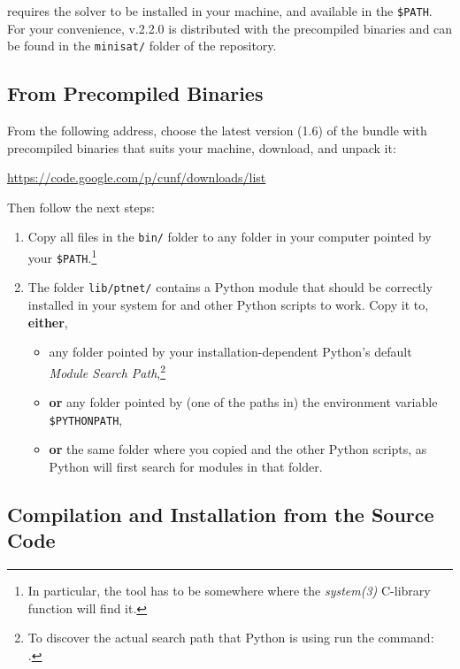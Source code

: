 \documentclass[a4paper]{refart}
\begin{document}
\cna requires the \minisat solver to be installed in your machine, and
available in the \verb!$PATH!.
For your convenience, \minisat v.2.2.0 is distributed with the precompiled
binaries and can be found in the \verb!minisat/! folder of the repository.

\subsection{From Precompiled Binaries}
\label{s:precompiled}

From the following address, choose the latest version (1.6) of the bundle
with precompiled binaries that suits your machine,
download, and unpack it:
\begin{center}
\url{https://code.google.com/p/cunf/downloads/list}
\end{center}
Then follow the next steps:
\begin{enumerate}
\item
  Copy all files in the \verb!bin/! folder to any folder in your
  computer pointed by your \verb!$PATH!.\footnote{In particular, the \minisat
  tool has to be somewhere where the \textit{system(3)} C-library function
  will find it.}
\item
  The folder \verb!lib/ptnet/! contains a Python module that should be
  correctly installed in your system for \cna and other Python scripts
  to work.
  Copy it to, \textbf{either},
  \begin{itemize}
  \item
    any folder pointed by your installation-dependent Python's default
    \textit{Module Search Path},\footnote{To discover the actual search
    path that Python is using run the command: \\
    .}
  \item
    \textbf{or} any folder pointed by (one of the paths in) the
    environment variable \verb!$PYTHONPATH!,
  \item
    \textbf{or} the same folder where you copied \cna and the other Python
    scripts, as Python will first search for modules in that folder.
  \end{itemize}
\end{enumerate}

\subsection{Compilation and Installation from the Source Code}
\label{s:compilation}
\end{document}
